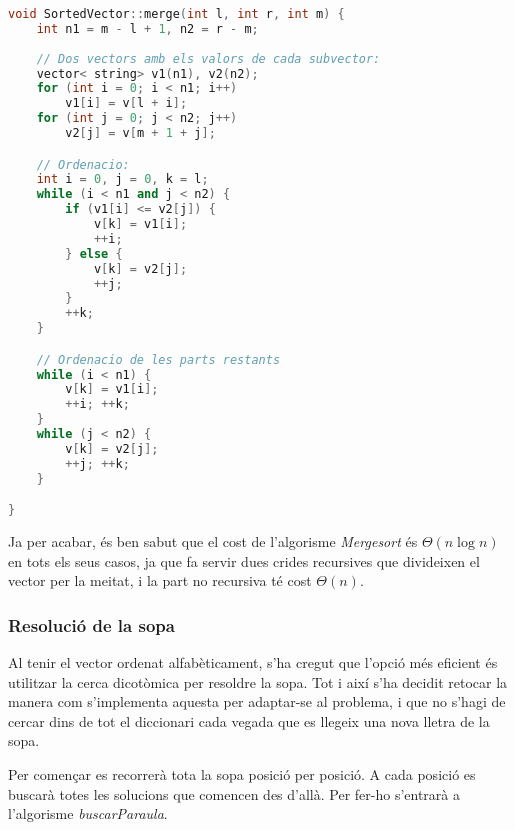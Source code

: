 \documentclass[titlepage]{article}
\begin{document}
\begin{lstlisting}[language=C++]
void SortedVector::merge(int l, int r, int m) {
    int n1 = m - l + 1, n2 = r - m;
    
    // Dos vectors amb els valors de cada subvector:
    vector< string> v1(n1), v2(n2);
    for (int i = 0; i < n1; i++)
        v1[i] = v[l + i];
    for (int j = 0; j < n2; j++)
        v2[j] = v[m + 1 + j];

    // Ordenacio:
    int i = 0, j = 0, k = l;
    while (i < n1 and j < n2) {
        if (v1[i] <= v2[j]) {
            v[k] = v1[i];
            ++i;
        } else {
            v[k] = v2[j];
            ++j;
        }
        ++k;
    }

    // Ordenacio de les parts restants
    while (i < n1) {
        v[k] = v1[i];
        ++i; ++k;
    }
    while (j < n2) {
        v[k] = v2[j];
        ++j; ++k;
    }

}
\end{lstlisting}

Ja per acabar, és ben sabut que el cost de l'algorisme \textit{Mergesort} és $\Theta(n\log{}n)$ en tots els seus casos, ja que fa servir dues crides recursives que divideixen el vector per la meitat, i la part no recursiva té cost $\Theta(n)$.


\subsubsection{Resolució de la sopa}
Al tenir el vector ordenat alfabèticament, s'ha cregut que l'opció més eficient és utilitzar la cerca dicotòmica per resoldre la sopa. Tot i així s'ha decidit retocar la manera com s'implementa aquesta per adaptar-se al problema, i que no s'hagi de cercar dins de tot el diccionari cada vegada que es llegeix una nova lletra de la sopa. \newline\par
Per començar es recorrerà tota la sopa posició per posició. A cada posició es buscarà totes les solucions que comencen des d'allà. Per fer-ho s'entrarà a l'algorisme \textit{buscarParaula}.
\end{document}
